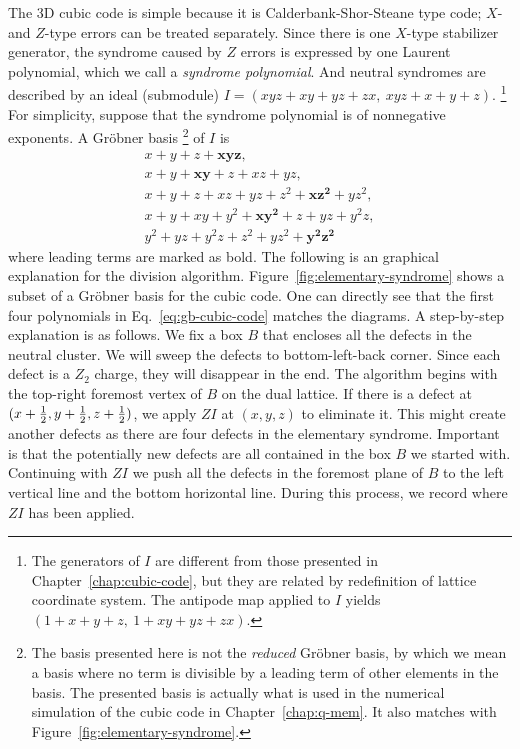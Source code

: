 The 3D cubic code is simple because it is Calderbank-Shor-Steane type code;
$X$- and $Z$-type errors can be treated separately.
Since there is one $X$-type stabilizer generator,
the syndrome caused by $Z$ errors is expressed by one Laurent polynomial,
which we call a \emph{syndrome polynomial}.
And neutral syndromes are described by an ideal (submodule) $I=(xyz+xy+yz+zx,~  xyz+x+y+z)$.%
\footnote{
The generators of $I$ are different from those presented in Chapter~\ref{chap:cubic-code},
but they are related by redefinition of lattice coordinate system.
The antipode map applied to $I$ yields $(1+x+y+z,~1+xy+yz+zx)$.}
For simplicity, suppose that the syndrome polynomial is of nonnegative exponents.
A Gr\"obner basis%
\footnote{%
The basis presented here is not the \emph{reduced} Gr\"obner basis,
by which we mean a basis where no term is divisible by a leading term of other elements in the basis.
The presented basis is actually what is used in the numerical simulation of the cubic code
in Chapter~\ref{chap:q-mem}.
It also matches with Figure~\ref{fig:elementary-syndrome}.
}
of $I$ is
\begin{align}
x+y+z+\mathbf{xyz}, \nonumber \\
x + y + \mathbf{x y} + z + x z + y z, \nonumber \\
x + y + z + x z + y z + z^2 + \mathbf{x z^2} + y z^2, \label{eq:gb-cubic-code} \\
x + y + x y + y^2 + \mathbf{x y^2} + z + y z + y^2 z,\nonumber \\
y^2 + y z + y^2 z + z^2 + y z^2 + \mathbf{y^2 z^2} \nonumber
\end{align}
where leading terms are marked as bold.
The following is an graphical explanation for the division algorithm.
Figure~\ref{fig:elementary-syndrome} shows a subset of a Gr\"obner basis for the cubic code.
One can directly see that the first four polynomials in Eq.~\eqref{eq:gb-cubic-code}
matches the diagrams.
A step-by-step explanation is as follows.
We fix a box $B$ that encloses all the defects in the neutral cluster.
We will sweep the defects to bottom-left-back corner.
Since each defect is a $Z_2$ charge, they will disappear in the end.
The algorithm begins with the top-right foremost vertex of $B$ on the dual lattice.
If there is a defect at $(x+\frac{1}{2},y+\frac{1}{2},z+\frac{1}{2})$,
we apply $ZI$ at $(x,y,z)$ to eliminate it.
This might create another defects as there are four defects in the elementary syndrome.
Important is that the potentially new defects
are all contained in the box $B$ we started with.
Continuing with $ZI$ we push all the defects in the foremost plane of $B$
to the left vertical line and the bottom horizontal line.
During this process, we record where $ZI$ has been applied.

